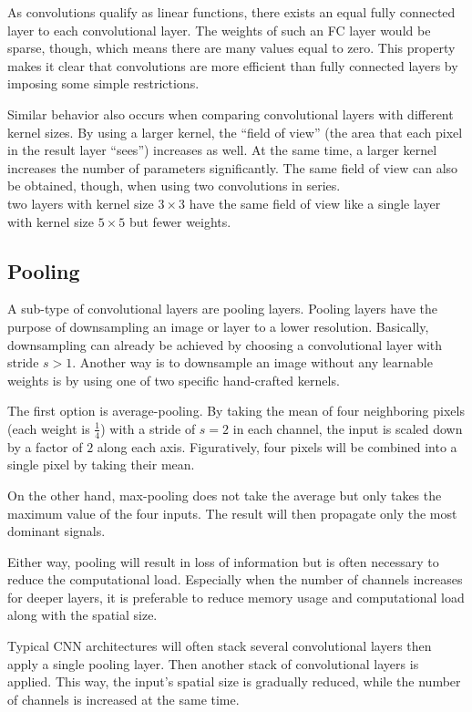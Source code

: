 As convolutions qualify as linear functions, there exists an equal fully connected layer to each convolutional layer.
The weights of such an FC layer would be sparse, though, which means there are many values equal to zero.
This property makes it clear that convolutions are more efficient than fully connected layers by imposing some simple restrictions.

Similar behavior also occurs when comparing convolutional layers with different kernel sizes.
By using a larger kernel, the ``field of view'' (the area that each pixel in the result layer ``sees'') increases as well.
At the same time, a larger kernel increases the number of parameters significantly.
The same field of view can also be obtained, though, when using two convolutions in series.\\
\eg two layers with kernel size $3 \times 3$ have the same field of view like a single layer with kernel size $5 \times 5$ but fewer weights.

\subsection{Pooling}
A sub-type of convolutional layers are pooling layers.
Pooling layers have the purpose of downsampling an image or layer to a lower resolution.
Basically, downsampling can already be achieved by choosing a convolutional layer with stride $s > 1$.
Another way is to downsample an image without any learnable weights is by using one of two specific hand-crafted kernels.

The first option is average-pooling.
By taking the mean of four neighboring pixels (each weight is $\frac{1}{4}$) with a stride of $s = 2$ in each channel, the input is scaled down by a factor of $2$ along each axis.
Figuratively, four pixels will be combined into a single pixel by taking their mean.

On the other hand, max-pooling does not take the average but only takes the maximum value of the four inputs.
The result will then propagate only the most dominant signals.

Either way, pooling will result in loss of information but is often necessary to reduce the computational load.
Especially when the number of channels increases for deeper layers, it is preferable to reduce memory usage and computational load along with the spatial size.

Typical CNN architectures will often stack several convolutional layers then apply a single pooling layer.
Then another stack of convolutional layers is applied.
This way, the input's spatial size is gradually reduced, while the number of channels is increased at the same time.

